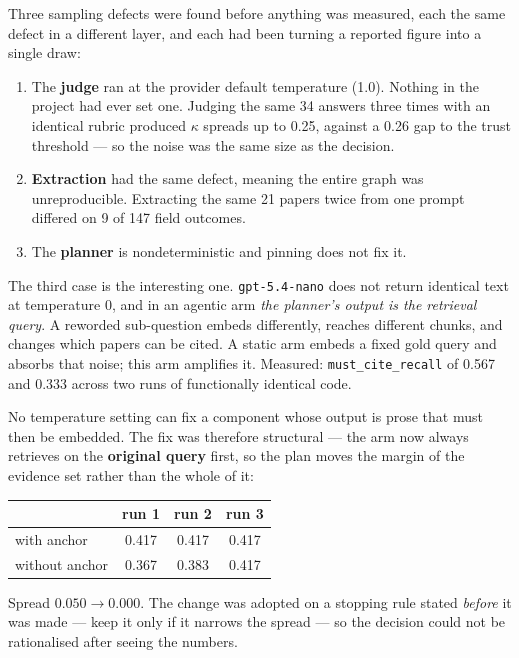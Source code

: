 Three sampling defects were found before anything was measured, each the same
defect in a different layer, and each had been turning a reported figure into
a single draw:

\begin{enumerate}[label=\arabic*.]
  \item The \textbf{judge} ran at the provider default temperature (1.0).
        Nothing in the project had ever set one. Judging the same 34 answers
        three times with an identical rubric produced $\kappa$ spreads up to
        0.25, against a 0.26 gap to the trust threshold --- so the noise was
        the same size as the decision.
  \item \textbf{Extraction} had the same defect, meaning the entire graph was
        unreproducible. Extracting the same 21 papers twice from one prompt
        differed on 9 of 147 field outcomes.
  \item The \textbf{planner} is nondeterministic and pinning does not fix it.
\end{enumerate}

The third case is the interesting one. \texttt{gpt-5.4-nano} does not return
identical text at temperature 0, and in an agentic arm \emph{the planner's
output is the retrieval query}. A reworded sub-question embeds differently,
reaches different chunks, and changes which papers can be cited. A static arm
embeds a fixed gold query and absorbs that noise; this arm amplifies it.
Measured: \texttt{must\_cite\_recall} of 0.567 and 0.333 across two runs of
functionally identical code.

No temperature setting can fix a component whose output is prose that must
then be embedded. The fix was therefore structural --- the arm now always
retrieves on the \textbf{original query} first, so the plan moves the margin
of the evidence set rather than the whole of it:

\begin{center}
\begin{tabular}{lccc}
\hline
 & run 1 & run 2 & run 3 \\
\hline
with anchor    & 0.417 & 0.417 & 0.417 \\
without anchor & 0.367 & 0.383 & 0.417 \\
\hline
\end{tabular}
\end{center}

Spread $0.050 \rightarrow 0.000$. The change was adopted on a stopping rule
stated \emph{before} it was made --- keep it only if it narrows the spread ---
so the decision could not be rationalised after seeing the numbers.

